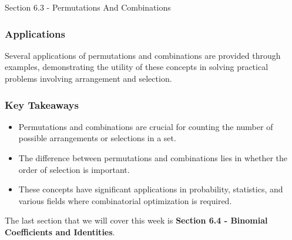 \begin{notes}{Section 6.3 - Permutations And Combinations}
    \subsubsection*{Applications}
    Several applications of permutations and combinations are provided through examples, demonstrating the utility of these concepts in solving practical problems involving arrangement and selection.
    
    \subsubsection*{Key Takeaways}
    \begin{itemize}
        \item Permutations and combinations are crucial for counting the number of possible arrangements or selections in a set.
        \item The difference between permutations and combinations lies in whether the order of selection is important.
        \item These concepts have significant applications in probability, statistics, and various fields where combinatorial optimization is required.
    \end{itemize}
\end{notes}

The last section that we will cover this week is \textbf{Section 6.4 - Binomial Coefficients and Identities}.

